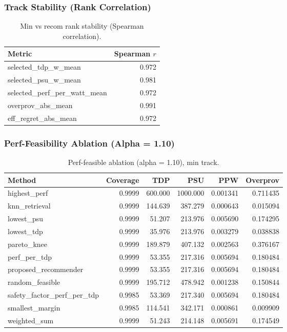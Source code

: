 \subsubsection{Track Stability (Rank Correlation)}
\begin{table}[t]
\centering
\small
\caption{Min vs recom rank stability (Spearman correlation).}
\label{tab:rank_corr}
\begin{tabular}{lr}
\hline
Metric & Spearman $r$ \\
\hline
selected\_tdp\_w\_mean & 0.972 \\
selected\_psu\_w\_mean & 0.981 \\
selected\_perf\_per\_watt\_mean & 0.972 \\
overprov\_abs\_mean & 0.991 \\
eff\_regret\_abs\_mean & 0.972 \\
\hline
\end{tabular}
\end{table}

\subsubsection{Perf-Feasibility Ablation (Alpha = 1.10)}
\begin{table}[t]
\centering
\small
\caption{Perf-feasible ablation (alpha = 1.10), min track.}
\label{tab:perf_alpha_min}
\begin{tabular}{lrrrrr}
\hline
Method & Coverage & TDP & PSU & PPW & Overprov \\
\hline
highest\_perf & 0.9999 & 600.000 & 1000.000 & 0.001341 & 0.711435 \\
knn\_retrieval & 0.9999 & 144.639 & 387.279 & 0.000643 & 0.015094 \\
lowest\_psu & 0.9999 & 51.207 & 213.976 & 0.005690 & 0.174295 \\
lowest\_tdp & 0.9999 & 35.976 & 213.976 & 0.003279 & 0.038838 \\
pareto\_knee & 0.9999 & 189.879 & 407.132 & 0.002563 & 0.376167 \\
perf\_per\_tdp & 0.9999 & 53.355 & 217.316 & 0.005694 & 0.180484 \\
proposed\_recommender & 0.9999 & 53.355 & 217.316 & 0.005694 & 0.180484 \\
random\_feasible & 0.9999 & 195.712 & 478.942 & 0.001238 & 0.150844 \\
safety\_factor\_perf\_per\_tdp & 0.9985 & 53.369 & 217.340 & 0.005694 & 0.180484 \\
smallest\_margin & 0.9985 & 114.541 & 342.171 & 0.000861 & 0.009909 \\
weighted\_sum & 0.9999 & 51.243 & 214.148 & 0.005691 & 0.174549 \\
\hline
\end{tabular}
\end{table}

